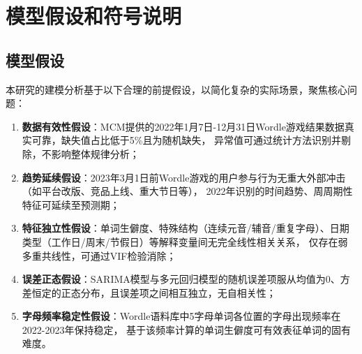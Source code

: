 \documentclass[12pt]{article}  %
\begin{document}
\section{模型假设和符号说明}

\subsection{模型假设}
本研究的建模分析基于以下合理的前提假设，以简化复杂的实际场景，聚焦核心问题：
\begin{enumerate}
  \item \textbf{数据有效性假设}：MCM提供的2022年1月7日-12月31日Wordle游戏结果数据真实可靠，缺失值占比低于5\%且为随机缺失，
  异常值可通过统计方法识别并剔除，不影响整体规律分析；
  \item \textbf{趋势延续假设}：2023年3月1日前Wordle游戏的用户参与行为无重大外部冲击（如平台改版、竞品上线、重大节日等），
  2022年识别的时间趋势、周周期性特征可延续至预测期；
  \item \textbf{特征独立性假设}：单词生僻度、特殊结构（连续元音/辅音/重复字母）、日期类型（工作日/周末/节假日）等解释变量间无完全线性相关关系，
  仅存在弱多重共线性，可通过VIF检验消除；
  \item \textbf{误差正态假设}：SARIMA模型与多元回归模型的随机误差项服从均值为0、方差恒定的正态分布，且误差项之间相互独立，无自相关性；
  \item \textbf{字母频率稳定性假设}：Wordle语料库中5字母单词各位置的字母出现频率在2022-2023年保持稳定，
  基于该频率计算的单词生僻度可有效表征单词的固有难度。
\end{enumerate}
\end{document}
